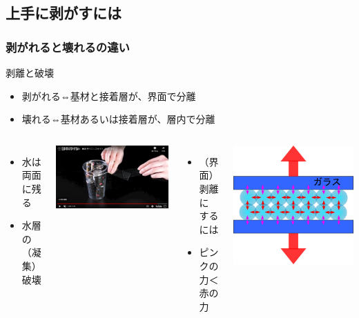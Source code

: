 \documentclass[unicode,12pt]{beamer}%
\begin{document}
\subsection{上手に剥がすには}
\begin{frame}
	\frametitle{剥がれると壊れるの違い}
	\begin{block}{剥離と破壊}
		\begin{itemize}
			\item 剥がれる⇔基材と接着層が、界面で分離
			\item 壊れる⇔基材あるいは接着層が、層内で分離
		\end{itemize}
	\end{block}
	
	\begin{columns}[c, onlytextwidth]
			\begin{itemize}
				\item 水は両面に残る
				\item 水層の（凝集）破壊
			\end{itemize}
			
			\centering
			\includegraphics[width=\textwidth]{glass_water4.png}
		\begin{itemize}
			\item （界面）剥離にするには
			\item ピンクの力＜赤の力
		\end{itemize}

		\centering
		\includegraphics[width=.6\textwidth]{glass_water.png}
	\end{columns}
\end{frame}
\end{document}
